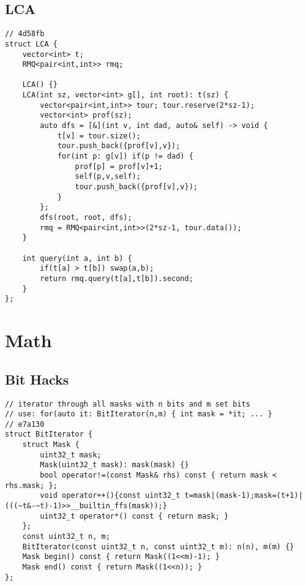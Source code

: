 \documentclass{article}
\begin{document}
\subsection{LCA}
\begin{verbatim}
// 4d58fb
struct LCA {
	vector<int> t;
	RMQ<pair<int,int>> rmq;

	LCA() {}
	LCA(int sz, vector<int> g[], int root): t(sz) {
		vector<pair<int,int>> tour; tour.reserve(2*sz-1);
		vector<int> prof(sz); 
		auto dfs = [&](int v, int dad, auto& self) -> void {
			t[v] = tour.size();
			tour.push_back({prof[v],v});
			for(int p: g[v]) if(p != dad) {
				prof[p] = prof[v]+1;
				self(p,v,self);
				tour.push_back({prof[v],v});
			}
		};
		dfs(root, root, dfs);
		rmq = RMQ<pair<int,int>>(2*sz-1, tour.data());
	}

	int query(int a, int b) {
		if(t[a] > t[b]) swap(a,b);
		return rmq.query(t[a],t[b]).second;
	}
};
\end{verbatim}
\section{Math}
\subsection{Bit Hacks}
\begin{verbatim}
// iterator through all masks with n bits and m set bits
// use: for(auto it: BitIterator(n,m) { int mask = *it; ... }
// e7a130
struct BitIterator {
	struct Mask {
		uint32_t mask;
		Mask(uint32_t mask): mask(mask) {}
		bool operator!=(const Mask& rhs) const { return mask < rhs.mask; };
		void operator++(){const uint32_t t=mask|(mask-1);mask=(t+1)|(((~t&-~t)-1)>>__builtin_ffs(mask));}
		uint32_t operator*() const { return mask; }
	};
	const uint32_t n, m;
	BitIterator(const uint32_t n, const uint32_t m): n(n), m(m) {}
	Mask begin() const { return Mask((1<<m)-1); }
	Mask end() const { return Mask((1<<n)); }
};
\end{verbatim}
\end{document}
